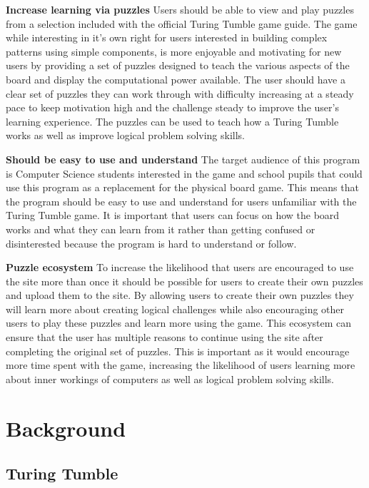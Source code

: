 \documentclass{l4proj}
\begin{document}
\textbf{Increase learning via puzzles} Users should be able to view and play puzzles from a selection included with the official Turing Tumble game guide. The game while interesting in it's own right for users interested in building complex patterns using simple components, is more enjoyable and motivating for new users by providing a set of puzzles designed to teach the various aspects of the board and display the computational power available. The user should have a clear set of puzzles they can work through with difficulty increasing at a steady pace to keep motivation high and the challenge steady to improve the user's learning experience. The puzzles can be used to teach how a Turing Tumble works as well as improve logical problem solving skills.    

\textbf{Should be easy to use and understand} The target audience of this program is Computer Science students interested in the game and school pupils that could use this program as a replacement for the physical board game. This means that the program should be easy to use and understand for users unfamiliar with the Turing Tumble game. It is important that users can focus on how the board works and what they can learn from it rather than getting confused or disinterested because the program is hard to understand or follow. 

\textbf{Puzzle ecosystem} To increase the likelihood that users are encouraged to use the site more than once it should be possible for users to create their own puzzles and upload them to the site. By allowing users to create their own puzzles they will learn more about creating logical challenges while also encouraging other users to play these puzzles and learn more using the game. This ecosystem can ensure that the user has multiple reasons to continue using the site after completing the original set of puzzles. This is important as it would encourage more time spent with the game, increasing the likelihood of users learning more about inner workings of computers as well as logical problem solving skills. 

\chapter{Background}
\section{Turing Tumble}
\end{document}
